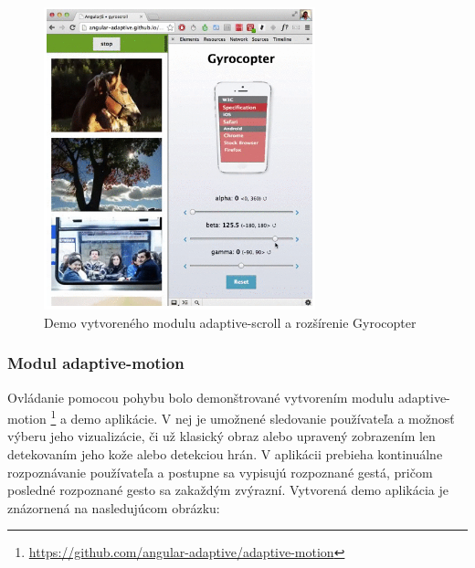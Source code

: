 \begin{figure}[H]
  \centering
  \includegraphics[width=0.7\textwidth]{img/adaptivescroll.png}
  \caption[Demo vytvoreného modulu adaptive-scroll a rozšírenie Gyrocopter]{
    Demo vytvoreného modulu adaptive-scroll a rozšírenie Gyrocopter}
  \label{fig: adaptivescroll}
\end{figure}


\newpage
\subsubsection{Modul adaptive-motion} %
\label{sub:adaptive_motion}

Ovládanie pomocou pohybu bolo demonštrované vytvorením modulu adaptive-motion \footnote{\url{https://github.com/angular-adaptive/adaptive-motion}} a demo aplikácie. V nej je umožnené sledovanie používateľa a možnosť výberu jeho vizualizácie, či už klasický obraz alebo upravený zobrazením len detekovaním jeho kože alebo detekciou hrán. V aplikácii prebieha kontinuálne rozpoznávanie používateľa a postupne sa vypisujú rozpoznané gestá, pričom posledné rozpoznané gesto sa zakaždým zvýrazní. Vytvorená demo aplikácia je znázornená na nasledujúcom obrázku:


